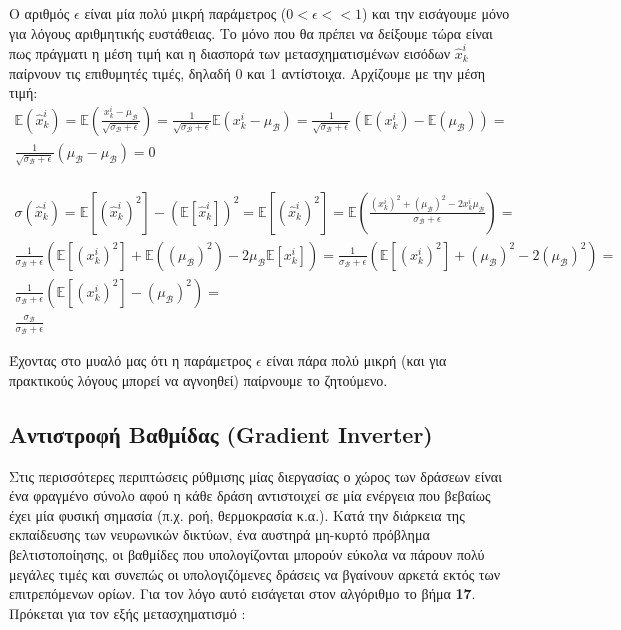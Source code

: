 \documentclass[11pt]{article} %
\numberwithin{equation}{subsection}
\begin{document}
Ο αριθμός $\epsilon$ είναι μία πολύ μικρή παράμετρος ($0 < \epsilon << 1$) και την εισάγουμε μόνο για λόγους αριθμητικής ευστάθειας. Το μόνο που θα πρέπει να δείξουμε τώρα είναι πως πράγματι η μέση τιμή και η διασπορά των μετασχηματισμένων εισόδων $\hat{x}_k^i$ παίρνουν τις επιθυμητές τιμές, δηλαδή 0 και 1 αντίστοιχα. Αρχίζουμε με την μέση τιμή:
\begin{align*}
\mathbb{E}(\hat{x}_k^i) = \mathbb{E}\left( \frac{x_k^i - \mu_{\mathcal{B}}}{\sqrt{\sigma_{\mathcal{B}} + \epsilon}}\right) = \frac{1}{\sqrt{\sigma_{\mathcal{B}} + \epsilon}} \mathbb{E} (x_k^i - \mu_{\mathcal{B}}) = \frac{1}{\sqrt{\sigma_{\mathcal{B}} + \epsilon}} (\mathbb{E}(x_k^i) - \mathbb{E}(\mu_{\mathcal{B}})) =  \\
\frac{1}{\sqrt{\sigma_{\mathcal{B}} + \epsilon}} (\mu_{\mathcal{B}} - \mu_{\mathcal{B}}) = 0\\
\end{align*}

\begin{align*}
\sigma(\hat{x}_k^i) =   \mathbb{E}[(\hat{x}_k^i)^2] - (\mathbb{E}[\hat{x}_k^i])^2  =  \mathbb{E}[(\hat{x}_k^i)^2] = \mathbb{E}\left( \frac{(x_k^i)^2 + (\mu_{\mathcal{B}})^2 - 2x_k^i \mu_{\mathcal{B}}}{\sigma_{\mathcal{B}} + \epsilon}\right) =\\
 \frac{1}{\sigma_{\mathcal{B}} + \epsilon} \left(\mathbb{E}[(x_k^i)^2] + \mathbb{E}((\mu_{\mathcal{B}})^2) - 2\mu_{\mathcal{B}} \mathbb{E}[x_k^i]\right) =  \frac{1}{\sigma_{\mathcal{B}} + \epsilon} \left(\mathbb{E}[(x_k^i)^2] + (\mu_{\mathcal{B}})^2 - 2(\mu_{\mathcal{B}})^2\right) = \\
\frac{1}{\sigma_{\mathcal{B}} + \epsilon} \left(\mathbb{E}[(x_k^i)^2] - (\mu_{\mathcal{B}})^2\right) = \\
\frac{\sigma_{\mathcal{B}}}{\sigma_{\mathcal{B}} + \epsilon}
\end{align*}

Έχοντας στο μυαλό μας ότι η παράμετρος $\epsilon$ είναι πάρα πολύ μικρή (και για πρακτικούς λόγους μπορεί να αγνοηθεί) παίρνουμε το ζητούμενο.

\subsection{Αντιστροφή Βαθμίδας (Gradient Inverter)}

Στις περισσότερες περιπτώσεις ρύθμισης μίας διεργασίας ο χώρος των δράσεων είναι ένα φραγμένο σύνολο αφού η κάθε δράση αντιστοιχεί σε μία ενέργεια που βεβαίως έχει μία φυσική σημασία (π.χ. ροή, θερμοκρασία κ.α.). Κατά την διάρκεια της εκπαίδευσης των νευρωνικών δικτύων, ένα αυστηρά μη-κυρτό πρόβλημα βελτιστοποίησης, οι βαθμίδες που υπολογίζονται μπορούν εύκολα να πάρουν πολύ μεγάλες τιμές και συνεπώς οι υπολογιζόμενες δράσεις να βγαίνουν αρκετά εκτός των επιτρεπόμενων ορίων. Για τον λόγο αυτό εισάγεται στον αλγόριθμο το βήμα \textbf{17}. Πρόκεται για τον εξής μετασχηματισμό \cite{gradinv}:
\end{document}
